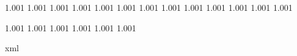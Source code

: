 




\chardef{}
\chardef{}

\newtoks\everywritestring

\def\writedirect  {\immediate\write\statuswrite}
\def\writeline    {\writedirect{}}
\def\writestring#1{\begingroup\the\everywritestring\writedirect{#1}\endgroup}

\ifx\normalmessage    \undefined \let\normalmessage         \message               \fi
\ifx\normalwritestatus\undefined \def\normalwritestatus#1#2{\writedirect{#1 : #2}} \fi


 {1.001}
 {1.001}
   {1.001}
  {1.001}
    {1.001}
    {1.001}
     {1.001}
     {1.001}
   {1.001}
    {1.001}
  {1.001}
    {1.001}
    {1.001}

 {1.001}
 {1.001}
 {1.001}
 {1.001}
 {1.001}
 {1.001}

\startruntimeluacode
    \edef\asciia{}
    \edef\asciib{xml}
    \ifx\asciia\asciib %
        \long\def\writebanner  #1{\writestring  {<m t='banner'>#1</m>}}
        \long\def\writestatus#1#2{\writestring  {<m t='#1'>#2</m>}}
        \long\def\message      #1{\normalmessage{<m t='message'>#1</m>}}
    \else
        \let\writebanner\writestring
        \let\writestatus\normalwritestatus
        \let\message    \normalmessage
    \fi
\stopruntimeluacode

